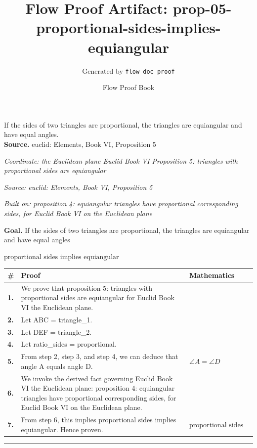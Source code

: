 \documentclass[11pt]{article}
\title{Flow Proof Artifact: prop-05-proportional-sides-implies-equiangular}
\author{Generated by \texttt{flow doc proof}}
\date{Flow Proof Book}
\theoremstyle{definition}
\begin{document}
\maketitle
If the sides of two triangles are proportional, the triangles are equiangular and have equal angles.\\[0.5em]
\textbf{Source.} euclid: Elements, Book VI, Proposition 5\\[0.5em]
\bigskip
{}\par
\smallskip\noindent\textit{Coordinate: the Euclidean plane \cdot Euclid Book VI \cdot Proposition 5: triangles with proportional sides are equiangular}\par
\smallskip\noindent\textit{Source: euclid: Elements, Book VI, Proposition 5}\par
\smallskip\noindent\textit{Built on: proposition 4: equiangular triangles have proportional corresponding sides, for Euclid Book VI on the Euclidean plane}\par
\medskip
\noindent\textbf{Goal.} If the sides of two triangles are proportional, the triangles are equiangular and have equal angles\par
\noindent$\displaystyle \text{proportional sides implies equiangular}$\par
\medskip
\noindent
\begin{tabular}{@{} >{\raggedright\arraybackslash}p{} >{\raggedright\arraybackslash}p{} >{\raggedleft\arraybackslash}p{} @{}}
\textbf{\#} & \textbf{Proof} & \textbf{Mathematics} \\
\midrule
\textbf{1.} & We prove that proposition 5: triangles with proportional sides are equiangular for Euclid Book VI the Euclidean plane. & \\[0.45em]
\textbf{2.} & Let ABC = triangle\_1. & \\[0.45em]
\textbf{3.} & Let DEF = triangle\_2. & \\[0.45em]
\textbf{4.} & Let ratio\_sides = proportional. & \\[0.45em]
\textbf{5.} & From step 2, step 3, and step 4, we can deduce that angle A equals angle D. & $\displaystyle \angle A = \angle D$ \\[0.45em]
\textbf{6.} & We invoke the derived fact governing Euclid Book VI the Euclidean plane: proposition 4: equiangular triangles have proportional corresponding sides, for Euclid Book VI on the Euclidean plane. & \\[0.45em]
\textbf{7.} & From step 6, this implies proportional sides implies equiangular. Hence proven. & $\displaystyle \text{proportional sides implies equiangular}$ \\[0.45em]
\bottomrule
\end{tabular}
\label{thm:Geometry-Euclid Book VI-proposition_5_triangles_with_proportional_sides_are_equiangular}
\par\medskip\hrule
\end{document}
